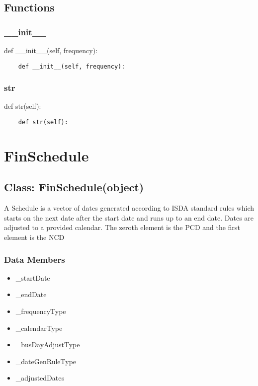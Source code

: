 \documentclass[twoside,11pt]{book}
\begin{document}
\subsection*{Functions}

\subsubsection*{{\bf \_\_init\_\_}}
def \_\_init\_\_(self, frequency): 

\begin{lstlisting}
    def __init__(self, frequency):
\end{lstlisting}

\subsubsection*{{\bf str}}
def str(self): 

\begin{lstlisting}
    def str(self):
\end{lstlisting}

\newpage
\section{FinSchedule}

\subsection*{Class: FinSchedule(object)}
A Schedule is a vector of dates generated according to ISDA standard rules which starts on the next date after the start date and runs up to an end date. Dates are adjusted to a provided calendar. The zeroth element is the PCD and the first element is the NCD  

\subsubsection*{Data Members}
\begin{itemize}
\item{\_startDate}
\item{\_endDate}
\item{\_frequencyType}
\item{\_calendarType}
\item{\_busDayAdjustType}
\item{\_dateGenRuleType}
\item{\_adjustedDates}
\end{itemize}
\end{document}
